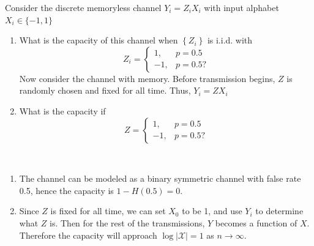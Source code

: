 \begin{exercise}{ Consider the discrete memoryless channel $Y_{i}=Z_{i} X_{i}$ with input alphabet $X_{i} \in\{-1,1\}$
  \begin{enumerate}
    \item What is the capacity of this channel when $\left\{Z_{i}\right\}$ is i.i.d. with
    $$
    Z_{i}=\left\{\begin{aligned}
    1, & p=0.5 \\
    -1, & p=0.5 ?
    \end{aligned}\right.
    $$
    Now consider the channel with memory. Before transmission begins, $Z$ is randomly chosen and fixed for all time. Thus, $Y_{i}=Z X_{i}$
    \item  What is the capacity if
    $$
    Z=\left\{\begin{aligned}
    1, & p=0.5 \\
    -1, & p=0.5 ?
    \end{aligned}\right.
    $$
  \end{enumerate}  }
  \begin{solution}
  \par{~}
  \begin{enumerate}
    \item { The channel can be modeled as a binary symmetric channel with false rate 0.5, hence the capacity is $1-H(0.5) = 0$.}
    \item { Since $Z$ is fixed for all time, we can set $X_0$ to be 1, and use $Y_i$ to determine what $Z$ is. Then for the rest of the transmissions, $Y$ becomes a function of $X$. Therefore the capacity will approach $\log |\mathcal{X}| = 1$ as $n \rightarrow \infty$. }
  \end{enumerate}
  \end{solution}
  \label{ex8}
\end{exercise}

